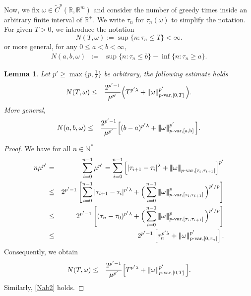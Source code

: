 \documentclass[10pt]{article}
\numberwithin{equation}{section} %
\newcommand{\R}{\ensuremath{\mathbb{R}}}
\newcommand{\N}{\ensuremath{\mathbb{N}}}
\newcommand{\ltn}{\ensuremath{\left| \! \left| \! \left|}}
\newcommand{\rtn}{\ensuremath{\right| \! \right| \! \right|}}
\newtheorem{lemma}[theorem]{Lemma}
\begin{document}
Now, we fix $\omega\in \widetilde{C}^{p}(\R,\R^m)$ and consider the number of greedy times inside an arbitrary finite interval of $\R^+$. We write $\tau_n$ for $\tau_n(\omega)$ to simplify the notation. For given $T>0$, we introduce the notation 
\begin{equation}\label{N}
N(T,\omega):= \sup \{n: \tau_n\leq T\}<\infty.
\end{equation}
or more general, for any $0\leq a < b <\infty$,
\begin{eqnarray}
N(a,b,\omega)&:=& \sup\{n: \tau_n\leq b\}- \inf\{n: \tau_n\geq a\}.
\end{eqnarray}
\begin{lemma}
Let $p'\geq \max\{p,\frac{1}{\lambda}\}$ be arbitrary, the following estimate holds
\begin{eqnarray}\label{mu2}
N(T,\omega)&\leq& \frac{2^{p'-1}}{\mu^{p'}} \Big( T^{p'\lambda}+\ltn\omega\rtn^{p'}_{p\text{-var},[0,T]}\Big).
\end{eqnarray}
More general,
\begin{eqnarray}\label{Nab2}
N(a,b,\omega)&\leq& \frac{2^{p'-1}}{\mu^{p'} }\Big[ (b-a)^{p'\lambda}+\ltn\omega\rtn^{p'}_{p\text{-}\rm{var},[a,b]}\Big].
\end{eqnarray}
\end{lemma}
\begin{proof}
  We have for all $n\in \N^*$
\begin{eqnarray}\label{estN}
n\mu^{p'} &= & \sum_{i=0}^{n-1} \mu^{p'} = \sum_{i=0}^{n-1}\left[ |\tau_{i+1}-\tau_i|^{\lambda}+\ltn\omega\rtn_{p\text{-var},[\tau_i,\tau_{i+1}]}\right]^{p'} \notag\\
&\leq& 2^{p'-1}\left[\sum_{i=0}^{n-1} |\tau_{i+1}-\tau_i|^{p'\lambda }+ \Big(\sum_{i=0}^{n-1} \ltn\omega\rtn^p_{p\text{-var},[\tau_i,\tau_{i+1}]}\Big)^{p'/p}\right]\notag\\
&\leq& 2^{p'-1}\left[(\tau_n-\tau_0)^{p'\lambda }+ \Big(\sum_{i=0}^{n-1} \ltn\omega\rtn^p_{p\text{-var},[\tau_i,\tau_{i+1}]}\Big)^{p'/p}\right]\notag\\
&\leq &  2^{p'-1}\left[\tau_n^{p'\lambda} + \ltn\omega\rtn^{p'}_{p\text{-var},[0,\tau_n]}\right].
\end{eqnarray}
Consequently, we obtain
\begin{eqnarray*}%
N(T,\omega)&\leq& \frac{2^{p'-1}}{\mu^{p'}} \Big[ T^{p'\lambda}+\ltn\omega\rtn^{p'}_{p\text{-var},[0,T]}\Big].
\end{eqnarray*}
Similarly, \eqref{Nab2} holds.
\end{proof}
\end{document}
